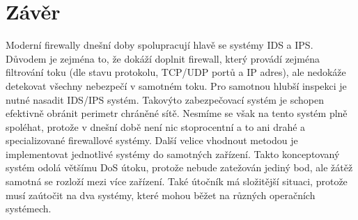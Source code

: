 \documentclass[11pt,twoside,a4paper]{article}
\begin{document}
\section{Závěr}
Moderní firewally dnešní doby spolupracují hlavě se systémy IDS a IPS. Důvodem je zejména to, že dokáží doplnit firewall, který provádí zejména filtrování toku (dle stavu protokolu, TCP/UDP portů a IP adres), ale nedokáže detekovat všechny nebezpečí v samotném toku. Pro samotnou hlubší inspekci je nutné nasadit IDS/IPS systém. Takovýto zabezpečovací systém je schopen efektivně obránit perimetr chráněné sítě. Nesmíme se však na tento systém plně spoléhat, protože v dnešní době není nic stoprocentní a to ani drahé a specializované firewallové systémy. Další velice vhodnout metodou je implementovat jednotlivé systémy do samotných zařízení. Takto konceptovaný systém odolá většímu DoS útoku, protože nebude zatežován jediný bod, ale žátěž samotná se rozloží mezi více zařízení. Také útočník má složitější situaci, protože musí zaútočit na dva systémy, které mohou běžet na různých operačních systémech.
\nocite{*}
{
	\def\CS{$\cal C\kern-0.1667em\lower.5ex\hbox{$\cal S$}\kern-0.075em $}
	
}
\end{document}
